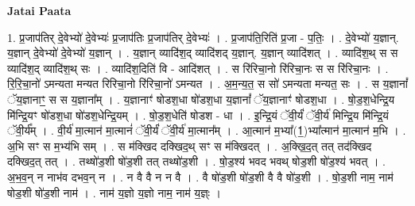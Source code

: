 \documentclass[17pt]{extarticle}
\begin{document}
\textbf{Jatai Paata} \newline

1. प्र॒जाप॑तिर् दे॒वेभ्यो॑ दे॒वेभ्यः॑ प्र॒जाप॑तिः प्र॒जाप॑तिर् दे॒वेभ्यः॑ । . प्र॒जाप॑ति॒रिति॑ प्र॒जा - प॒तिः॒ । . दे॒वेभ्यो॑ य॒ज्ञान्. य॒ज्ञान् दे॒वेभ्यो॑ दे॒वेभ्यो॑ य॒ज्ञान् । . य॒ज्ञान् व्यादि॑श॒द् व्यादि॑शद् य॒ज्ञान्. य॒ज्ञान् व्यादि॑शत् । . व्यादि॑श॒थ् स स व्यादि॑श॒द् व्यादि॑श॒थ् सः । . व्यादि॑श॒दिति॑ वि - आदि॑शत् । . स रि॑रिचा॒नो रि॑रिचा॒नः स स रि॑रिचा॒नः । . रि॒रि॒चा॒नो॑ ऽमन्यता मन्यत रिरिचा॒नो रि॑रिचा॒नो॑ ऽमन्यत । . अ॒म॒न्य॒त॒ स सो॑ ऽमन्यता मन्यत॒ सः । . स य॒ज्ञानां᳚ ॅय॒ज्ञानाꣳ॒॒ स स य॒ज्ञाना᳚म् । . य॒ज्ञानाꣳ॑ षोडश॒धा षो॑डश॒धा य॒ज्ञानां᳚ ॅय॒ज्ञानाꣳ॑ षोडश॒धा । . षो॒ड॒श॒धेन्द्रि॒य मि॑न्द्रि॒यꣳ षो॑डश॒धा षो॑डश॒धेन्द्रि॒यम् । . षो॒ड॒श॒धेति॑ षोडश - धा । . इ॒न्द्रि॒यं ॅवी॒र्यं॑ ॅवी॒र्य॑ मिन्द्रि॒य मि॑न्द्रि॒यं ॅवी॒र्य᳚म् । . वी॒र्य॑ मा॒त्मान॑ मा॒त्मानं॑ ॅवी॒र्यं॑ ॅवी॒र्य॑ मा॒त्मान᳚म् । . आ॒त्मान॑ म॒भ्या᳚(1॒)भ्या᳚त्मान॑ मा॒त्मान॑ म॒भि । . अ॒भि सꣳ स म॒भ्य॑भि सम् । . स म॑क्खिद दक्खिद॒थ् सꣳ स म॑क्खिदत् । . अ॒क्खि॒द॒त् तत् तद॑क्खिद दक्खिद॒त् तत् । . तथ्षो॑ड॒शी षो॑ड॒शी तत् तथ्षो॑ड॒शी । . षो॒ड॒श्य॑ भवद भवथ् षोड॒शी षो॑ड॒श्य॑ भवत् । . अ॒भ॒व॒न् न नाभ॑व दभव॒न् न । . न वै वै न न वै । . वै षो॑ड॒शी षो॑ड॒शी वै वै षो॑ड॒शी । . षो॒ड॒शी नाम॒ नाम॑ षोड॒शी षो॑ड॒शी नाम॑ । . नाम॑ य॒ज्ञो य॒ज्ञो नाम॒ नाम॑ य॒ज्ञ्ः । \newline
\end{document}
